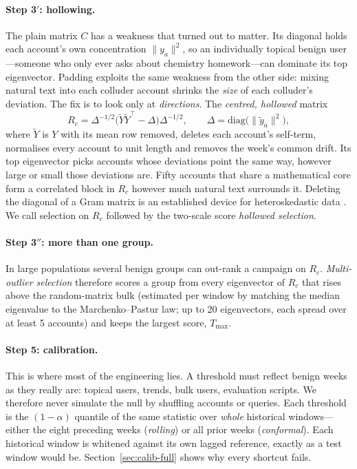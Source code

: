 \paragraph{Step 3$'$: hollowing.} The plain matrix $C$ has a weakness that turned out to matter. Its diagonal holds each account's own concentration $\|y_a\|^2$, so an individually topical benign user---someone who only ever asks about chemistry homework---can dominate its top eigenvector. Padding exploits the same weakness from the other side: mixing natural text into each colluder account shrinks the \emph{size} of each colluder's deviation. The fix is to look only at \emph{directions}. The \emph{centred, hollowed} matrix
\begin{equation}
R_c=\Delta^{-1/2}\bigl(\tilde Y\tilde Y^\top-\Delta\bigr)\Delta^{-1/2},\qquad \Delta=\mathrm{diag}\bigl(\|\tilde y_a\|^2\bigr),
\end{equation}
where $\tilde Y$ is $Y$ with its mean row removed, deletes each account's self-term, normalises every account to unit length and removes the week's common drift. Its top eigenvector picks accounts whose deviations point the same way, however large or small those deviations are. Fifty accounts that share a mathematical core form a correlated block in $R_c$ however much natural text surrounds it. Deleting the diagonal of a Gram matrix is an established device for heteroskedastic data \citep{cai2021subspace,zhang2022heteroskedastic}. We call selection on $R_c$ followed by the two-scale score \emph{hollowed selection}.

\paragraph{Step 3$''$: more than one group.} In large populations several benign groups can out-rank a campaign on $R_c$. \emph{Multi-outlier selection} therefore scores a group from every eigenvector of $R_c$ that rises above the random-matrix bulk (estimated per window by matching the median eigenvalue to the Marchenko--Pastur law; up to 20 eigenvectors, each spread over at least 5 accounts) and keeps the largest score, $T_{\max}$.

\paragraph{Step 5: calibration.} This is where most of the engineering lies. A threshold must reflect benign weeks as they really are: topical users, trends, bulk users, evaluation scripts. We therefore never simulate the null by shuffling accounts or queries. Each threshold is the $(1-\alpha)$ quantile of the same statistic over \emph{whole} historical windows---either the eight preceding weeks (\emph{rolling}) or all prior weeks (\emph{conformal}). Each historical window is whitened against its own lagged reference, exactly as a test window would be. Section~\ref{sec:calib-full} shows why every shortcut fails.

